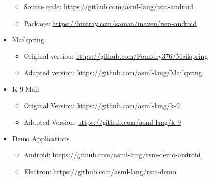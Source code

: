 \begin{itemize}
\begin{itemize}
        \item Source code: \url{https://github.com/asml-lang/rsm-android}
        \item Package: \url{https://bintray.com/saman/maven/rsm-android}
        \end{itemize}         
    \item Mailspring
        \begin{itemize}
        \item Original version: \url{https://github.com/Foundry376/Mailspring}
        \item Adapted version: \url{https://github.com/asml-lang/Mailspring}
        \end{itemize}
    \item K-9 Mail
        \begin{itemize}
        \item Original Version: \url{https://github.com/asml-lang/k-9}
        \item Adapted Version: \url{https://github.com/asml-lang/k-9}
        \end{itemize}    
        
   \item Demo Applications
        \begin{itemize}
        \item Android: \url{https://github.com/asml-lang/rsm-demo-android}
        \item Electron: \url{https://github.com/asml-lang/rsm-demo}
        \end{itemize}        
        
\end{itemize}
